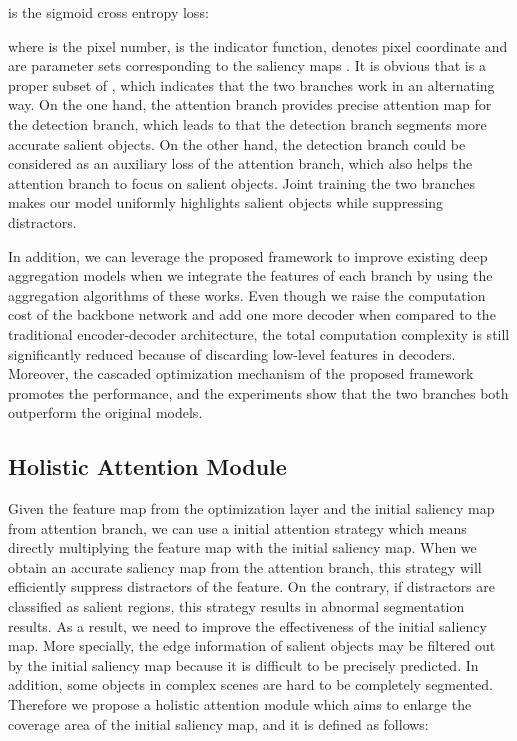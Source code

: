 \documentclass[10pt,twocolumn,letterpaper]{article}
\begin{document}
 is the sigmoid cross entropy loss:

where  is the pixel number,  is the indicator function,  denotes pixel coordinate and  are parameter sets corresponding to the saliency maps . It is obvious that  is a proper subset of , which indicates that the two branches work in an alternating way. On the one hand, the attention branch provides precise attention map for the detection branch, which leads to that the detection branch segments more accurate salient objects. On the other hand, the detection branch could be considered as an auxiliary loss of the attention branch, which also helps the attention branch to focus on salient objects. Joint training the two branches makes our model uniformly highlights salient objects while suppressing distractors.

In addition, we can leverage the proposed framework to improve existing deep aggregation models when we integrate the features of each branch by using the aggregation algorithms of these works. Even though we raise the computation cost of the backbone network and add one more decoder when compared to the traditional encoder-decoder architecture, the total computation complexity is still significantly reduced because of discarding low-level features in decoders. Moreover, the cascaded optimization mechanism of the proposed framework promotes the performance, and the experiments show that the two branches both outperform the original models.

\subsection{Holistic Attention Module}\label{3.2}
Given the feature map from the optimization layer and the initial saliency map from attention branch, we can use a initial attention strategy which means directly multiplying the feature map with the initial saliency map. When we obtain an accurate saliency map from the attention branch, this strategy will efficiently suppress distractors of the feature. On the contrary, if distractors are classified as salient regions, this strategy results in abnormal segmentation results. As a result, we need to improve the effectiveness of the initial saliency map. More specially, the edge information of salient objects may be filtered out by the initial saliency map because it is difficult to be precisely predicted. In addition, some objects in complex scenes are hard to be completely segmented. Therefore we propose a holistic attention module which aims to enlarge the coverage area of the initial saliency map, and it is defined as follows:
\end{document}
